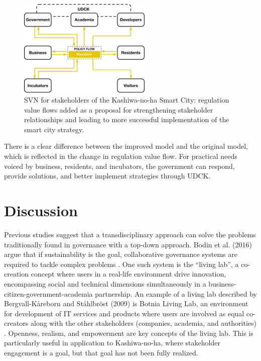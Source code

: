 \documentclass[conference]{IEEEtran}
\begin{document}
\begin{figure}[ht!] %
\centering
\includegraphics[width=2.5in]{SVN_3_v_6.pdf}
\caption{SVN for stakeholders of the Kashiwa-no-ha Smart City: regulation value flows added as a proposal for strengthening stakeholder relationships and leading to more successful implementation of the smart city strategy.}
\label{Compare_S}
\end{figure}

There is a clear difference between the improved model and the original model, which is reflected in the change in regulation value flow. For practical needs voiced by business, residents, and incubators, the government can respond, provide solutions, and better implement strategies through UDCK.


\section{\textbf{Discussion}}

Previous studies suggest that a transdisciplinary approach can solve the problems traditionally found in governance with a top-down approach. Bodin et al. (2016) argue that if sustainability is the goal, collaborative governance systems are required to tackle complex problems \cite{bodin2016theorizing}. One such system is the  ``living lab'', a co-creation concept where users in a real-life environment drive innovation, encompassing social and technical dimensions simultaneously in a business-citizen-government-academia partnership. An example of a living lab described by Bergvall-K{\aa}reborn and St{\aa}hlbr{\"o}st (2009) is Botnia Living Lab, an environment for development of IT services and products where users are involved as equal co-creators along with the other stakeholders (companies, academia, and authorities) \cite{bergvall2009living}. Openness, realism, and empowerment are key concepts of the living lab. This is particularly useful in application to Kashiwa-no-ha, where stakeholder engagement is a goal, but that goal has not been fully realized.
\end{document}
